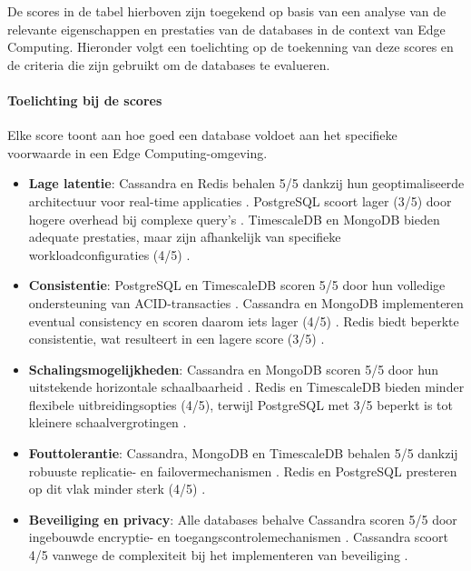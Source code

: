 De scores in de tabel hierboven zijn toegekend op basis van een analyse van de relevante eigenschappen en prestaties van de databases in de context van Edge Computing. Hieronder volgt een toelichting op de toekenning van deze scores en de criteria die zijn gebruikt om de databases te evalueren.

\paragraph{Toelichting bij de scores}
Elke score toont aan hoe goed een database voldoet aan het specifieke voorwaarde in een Edge Computing-omgeving.

\begin{itemize}
    \item \textbf{Lage latentie}: Cassandra en Redis behalen 5/5 dankzij hun geoptimaliseerde architectuur voor real-time applicaties \autocite{Mahmud2020}. PostgreSQL scoort lager (3/5) door hogere overhead bij complexe query’s \autocite{PostgreSQLDocumentation}. TimescaleDB en MongoDB bieden adequate prestaties, maar zijn afhankelijk van specifieke workloadconfiguraties (4/5) \autocite{TimescaleDBDocumentation, MongoDBDocumentation}.
    \item \textbf{Consistentie}: PostgreSQL en TimescaleDB scoren 5/5 door hun volledige ondersteuning van ACID-transacties \autocite{PostgreSQLDocumentation, TimescaleDBDocumentation}. Cassandra en MongoDB implementeren eventual consistency en scoren daarom iets lager (4/5) \autocite{CassandraDocumentation, MongoDBDocumentation}. Redis biedt beperkte consistentie, wat resulteert in een lagere score (3/5) \autocite{RedisDocumentation}.
    \item \textbf{Schalingsmogelijkheden}: Cassandra en MongoDB scoren 5/5 door hun uitstekende horizontale schaalbaarheid \autocite{CassandraDocumentation, MongoDBDocumentation}. Redis en TimescaleDB bieden minder flexibele uitbreidingsopties (4/5), terwijl PostgreSQL met 3/5 beperkt is tot kleinere schaalvergrotingen \autocite{PostgreSQLDocumentation, TimescaleDBDocumentation}.
    \item \textbf{Fouttolerantie}: Cassandra, MongoDB en TimescaleDB behalen 5/5 dankzij robuuste replicatie- en failovermechanismen \autocite{CassandraDocumentation, MongoDBDocumentation, TimescaleDBDocumentation}. Redis en PostgreSQL presteren op dit vlak minder sterk (4/5) \autocite{RedisDocumentation, PostgreSQLDocumentation}.
    \item \textbf{Beveiliging en privacy}: Alle databases behalve Cassandra scoren 5/5 door ingebouwde encryptie- en toegangscontrolemechanismen \autocite{PostgreSQLDocumentation, RedisDocumentation, TimescaleDBDocumentation, MongoDBDocumentation}. Cassandra scoort 4/5 vanwege de complexiteit bij het implementeren van beveiliging \autocite{CassandraDocumentation}.

\end{itemize}
